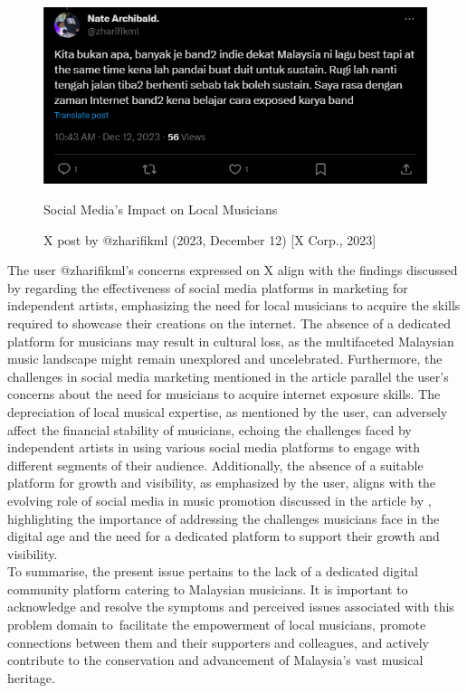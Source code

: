 \begin{figure}[h]
    \centering
    \includegraphics[width=0.8\linewidth]{mainmatter/images/probstate2.png}
    \caption{Social Media's Impact on Local Musicians}
    \caption*{X post by @zharifikml (2023, December 12) [X Corp., 2023]}
    \label{fig:myfig2}
\end{figure}
The user @zharifikml's concerns expressed on X align with the findings discussed by \textcite{zanuar22} regarding the effectiveness of social media platforms in marketing for independent artists, emphasizing the need for local musicians to acquire the skills required to showcase their creations on the internet. The absence of a dedicated platform for musicians may result in cultural loss, as the multifaceted Malaysian music landscape might remain unexplored and uncelebrated. Furthermore, the challenges in social media marketing mentioned in the article parallel the user's concerns about the need for musicians to acquire internet exposure skills. The depreciation of local musical expertise, as mentioned by the user, can adversely affect the financial stability of musicians, echoing the challenges faced by independent artists in using various social media platforms to engage with different segments of their audience. Additionally, the absence of a suitable platform for growth and visibility, as emphasized by the user, aligns with the evolving role of social media in music promotion discussed in the article by \textcite{jarvekulg21}, highlighting the importance of addressing the challenges musicians face in the digital age and the need for a dedicated platform to support their growth and visibility. \\

To summarise, the present issue pertains to the lack of a dedicated digital community platform catering to Malaysian musicians. It is important to acknowledge and resolve the symptoms and perceived issues associated with this problem domain to facilitate the empowerment of local musicians, promote connections between them and their supporters and colleagues, and actively contribute to the conservation and advancement of Malaysia's vast musical heritage.

